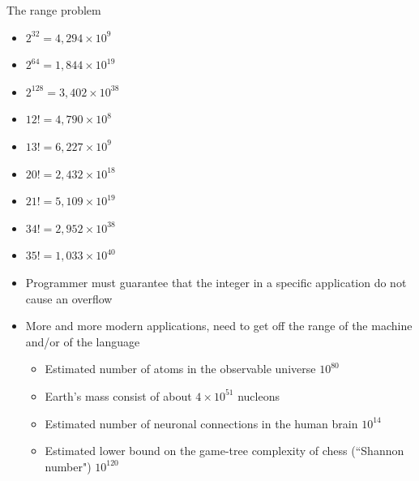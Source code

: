 \documentclass{beamer}
\begin{document}
\begin{frame}{The range problem}
  \begin{minipage}{0.35\textwidth}
  \begin{block}{}
    \begin{itemize}
      \item $2^{32} = 4,294 \times 10^9$
      \item $2^{64} = 1,844 \times 10^{19}$
      \item $2^{128} = 3,402 \times 10^{38}$
    \end{itemize}
  \end{block}
  \begin{block}{}
    \begin{itemize}
      \item $12! = 4,790 \times 10^8$
      \item $13! = 6,227 \times 10^{9}$
      \item $20! = 2,432 \times 10^{18}$
      \item $21! = 5,109 \times 10^{19}$
      \item $34! = 2,952 \times 10^{38}$
      \item $35! = 1,033 \times 10^{40}$
    \end{itemize}
  \end{block}
  \end{minipage}\hfill\begin{minipage}{0.6\textwidth}
  \begin{block}{}
    \begin{itemize}
      \item Programmer must guarantee that the integer in a specific application do not cause an overflow
      \item More and more modern applications, need to get off the range of the machine and/or of the language
      \begin{itemize}
        \item Estimated number of atoms in the observable universe $10^{80}$
        \item Earth’s mass consist of about $4\times10^{51}$ nucleons
        \item Estimated number of neuronal connections in the human brain $10^{14}$
        \item Estimated lower bound on the game-tree complexity of chess (``Shannon number") $10^{120}$
      \end{itemize}
    \end{itemize}
  \end{block}
  \end{minipage}
\end{frame}
\end{document}

